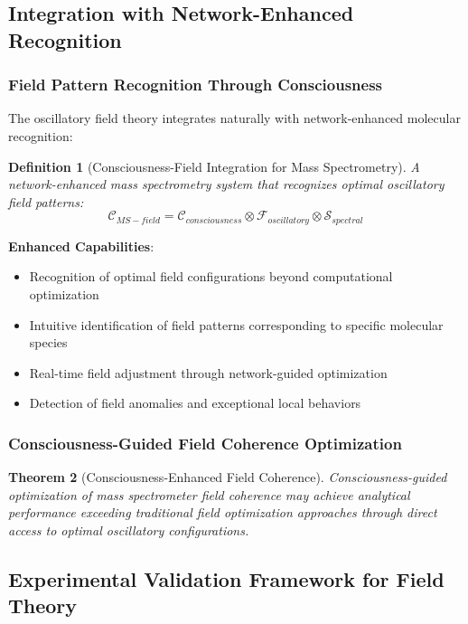 \documentclass[11pt,a4paper]{article}
\newtheorem{theorem}{Theorem}[section]
\newtheorem{definition}[theorem]{Definition}
\theoremstyle{remark}
\begin{document}
\subsection{Integration with Network-Enhanced Recognition}

\subsubsection{Field Pattern Recognition Through Consciousness}

The oscillatory field theory integrates naturally with network-enhanced molecular recognition:

\begin{definition}[Consciousness-Field Integration for Mass Spectrometry]
A network-enhanced mass spectrometry system that recognizes optimal oscillatory field patterns:
\begin{equation}
\mathcal{C}_{MS-field} = \mathcal{C}_{consciousness} \otimes \mathcal{F}_{oscillatory} \otimes \mathcal{S}_{spectral}
\end{equation}
\end{definition}

\textbf{Enhanced Capabilities}:
\begin{itemize}
\item Recognition of optimal field configurations beyond computational optimization
\item Intuitive identification of field patterns corresponding to specific molecular species
\item Real-time field adjustment through network-guided optimization
\item Detection of field anomalies and exceptional local behaviors
\end{itemize}

\subsubsection{Consciousness-Guided Field Coherence Optimization}

\begin{theorem}[Consciousness-Enhanced Field Coherence]
Consciousness-guided optimization of mass spectrometer field coherence may achieve analytical performance exceeding traditional field optimization approaches through direct access to optimal oscillatory configurations.
\end{theorem}

\subsection{Experimental Validation Framework for Field Theory}
\end{document}
